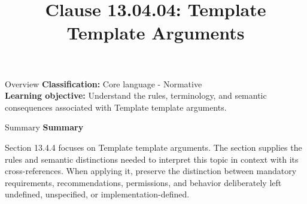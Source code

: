 \documentclass[10pt,letterpaper]{article}
\title{Clause 13.04.04: Template Template Arguments}
\author{}
\date{}
\begin{document}
\maketitle
\begin{CornellOverviewBox}{Overview}
\textbf{Classification:} Core language - Normative\\[2pt]
\textbf{Learning objective:} Understand the rules, terminology, and semantic consequences associated with Template template arguments.
\end{CornellOverviewBox}\begin{CornellSummaryBox}{Summary}
{\sffamily\bfseries\color{Accent} Summary}\par\vspace{3pt}Section 13.4.4 focuses on Template template arguments. The section supplies the rules and semantic distinctions needed to interpret this topic in context with its cross-references. When applying it, preserve the distinction between mandatory requirements, recommendations, permissions, and behavior deliberately left undefined, unspecified, or implementation-defined.
\end{CornellSummaryBox}
\end{document}
